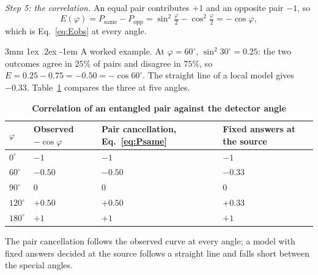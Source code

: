 \documentclass[%
 reprint, amsmath,amssymb, aps, prb, ]{revtex4-2}
\makeatletter
\numberwithin{equation}{section}
\renewcommand\paragraph{%
  \@startsection{paragraph}{4}{\z@}%
    {3mm \@plus 1ex \@minus .2ex}
    {-1em}
    {\normalfont\normalsize\itshape}}
\makeatother
\begin{document}
\emph{Step 5: the correlation.} An equal pair contributes $+1$ and an opposite pair $-1$, so
\begin{equation}
E(\varphi)=P_{\mathrm{same}}-P_{\mathrm{opp}}=\sin^2\!\tfrac{\varphi}{2}-\cos^2\!\tfrac{\varphi}{2}=-\cos\varphi ,
\end{equation}
which is Eq.~\eqref{eq:Eobs} at every angle.

\paragraph{A worked example.} At $\varphi=60^\circ$, $\sin^2 30^\circ=0.25$: the two outcomes agree in $25\%$ of pairs and disagree in $75\%$, so $E=0.25-0.75=-0.50=-\cos60^\circ$. The straight line of a local model gives $-0.33$. Table~\ref{tab:bell} compares the three at five angles.

\begin{table}[t!]
\centering
\caption{\textbf{Correlation of an entangled pair against the detector angle}}
\label{tab:bell}
\renewcommand{\arraystretch}{1.3}
\begin{tabular}{p{1.1cm}p{1.6cm}p{1.9cm}p{2.3cm}}
\toprule
\textbf{$\varphi$} & \textbf{Observed $-\cos\varphi$} & \textbf{Pair cancellation, Eq.~\eqref{eq:Psame}} & \textbf{Fixed answers at the source} \\
\midrule
$0^\circ$ & $-1$ & $-1$ & $-1$ \\
$60^\circ$ & $-0.50$ & $-0.50$ & $-0.33$ \\
$90^\circ$ & $0$ & $0$ & $0$ \\
$120^\circ$ & $+0.50$ & $+0.50$ & $+0.33$ \\
$180^\circ$ & $+1$ & $+1$ & $+1$ \\
\bottomrule
\end{tabular}
\vspace{0.2cm}
\begin{minipage}{0.95\columnwidth}
\justifying\footnotesize
The pair cancellation follows the observed curve at every angle; a model with fixed answers decided at the source follows a straight line and falls short between the special angles.
\end{minipage}
\end{table}
\end{document}
